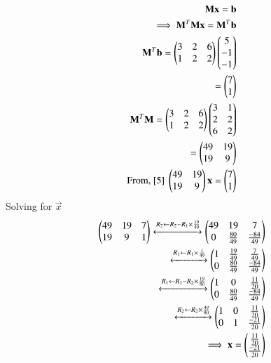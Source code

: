 \documentclass[journal,12pt,twocolumn]{IEEEtran}
\begin{document}
\begin{align}
    \mathbf{M}\mathbf{x}=\mathbf{b}\\
    \implies \mathbf{M}^T\mathbf{M}\mathbf{x}=\mathbf{M}^T\mathbf{b}\label{5}\\
    \mathbf{M}^T\mathbf{b}=\begin{pmatrix}3&2&6\\1&2&2\end{pmatrix}\begin{pmatrix}5\\-1\\-1\end{pmatrix}\\
    =\begin{pmatrix}7\\1\end{pmatrix}\\
    \mathbf{M}^T\mathbf{M}=\begin{pmatrix}3&2&6\\1&2&2\end{pmatrix}\begin{pmatrix}3&1\\2&2\\6&2\end{pmatrix}\\
    =\begin{pmatrix}49&19\\19&9\end{pmatrix}\\
\text{From, $\eqref{5}$ }
\begin{pmatrix}49&19\\19&9\end{pmatrix}\mathbf{x}= \begin{pmatrix}7\\1\end{pmatrix} 
\end{align}
Solving for $\vec{x}$
\begin{align}
  \begin{pmatrix}49&19&7\\19&9&1\end{pmatrix}\xleftrightarrow[]{R_2\leftarrow R_2- R_1\times \frac{19}{49}}\begin{pmatrix}49&19&7\\0&\frac{80}{49}&\frac{-84}{49}\end{pmatrix}\\
  \xleftrightarrow[]{R_1\leftarrow R_1\times \frac{1}{49}}\begin{pmatrix}1&\frac{19}{49}&\frac{7}{49}\\0&\frac{80}{49}&\frac{-84}{49}\end{pmatrix}
  \\\xleftrightarrow[]{R_1\leftarrow R_1- R_2\times \frac{19}{80}}\begin{pmatrix}1&0&\frac{11}{20}\\0&\frac{80}{49}&\frac{-84}{49}\end{pmatrix}\\
  \xleftrightarrow[]{R_2\leftarrow R_2\times \frac{49}{80}}\begin{pmatrix}1&0&\frac{11}{20}\\0&1&\frac{-21}{20}\end{pmatrix}
  \\ \implies \mathbf{x}=\begin{pmatrix}\frac{11}{20}\\\frac{-21}{20}\end{pmatrix}
\end{align}
\end{document}
